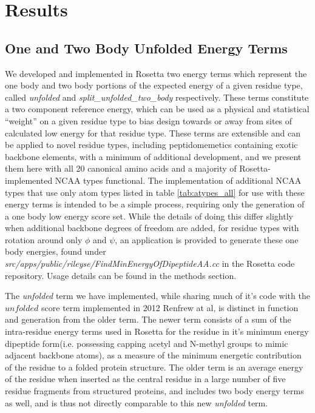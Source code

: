 \section{Results}


\subsection{One and Two Body Unfolded Energy Terms}
We developed and implemented in Rosetta two energy terms which represent the one body and two body portions of the expected energy of a given residue type, called \textit{unfolded} and \textit{split\_unfolded\_two\_body} respectively.
These terms constitute a two component reference energy, which can be used as a physical and statistical ``weight'' on a given residue type to bias design towards or away from sites of calculated low energy for that residue type.
These terms are extensible and can be applied to novel residue types, including peptidomemetics containing exotic backbone elements, with a minimum of additional development, and we present them here with all 20 canonical amino acids and a majority of Rosetta-implemented NCAA types functional.
The implementation of additional NCAA types that use only atom types listed in table \ref{tab:atypes_all} for use with these energy terms is intended to be a simple process, requiring only the generation of a one body low energy score set.
While the details of doing this differ slightly when additional backbone degrees of freedom are added, for residue types with rotation around only $\phi$ and $\psi$, an application is provided to generate these one body energies, found under \textit{src/apps/public/rileyse/FindMinEnergyOfDipeptideAA.cc} in the Rosetta code repository.
Usage details can be found in the methods section.

The \textit{unfolded} term we have implemented, while sharing much of it's code with the $unfolded$ score term implemented in 2012 Renfrew at al\cite{renfrew_incorporation_2012}, is distinct in function and generation from the older term.
The newer term consists of a sum of the intra-residue energy terms used in Rosetta for the residue in it's minimum energy dipeptide form(i.e. possessing capping acetyl and N-methyl groups to mimic adjacent backbone atoms), as a measure of the minimum energetic contribution of the residue to a folded protein structure.
The older term is an average energy of the residue when inserted as the central residue in a large number of five residue fragments from structured proteins, and includes two body energy terms as well, and is thus not directly comparable to this new \textit{unfolded} term.

